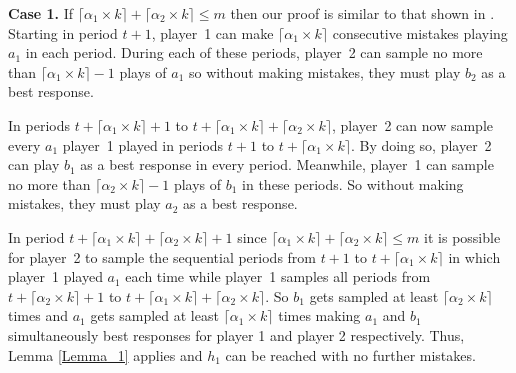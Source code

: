 \documentclass[11.5pt]{article}
\begin{document}
{\bf Case 1.} If $\lceil \alpha_1 \times k \rceil + \lceil \alpha_2 \times k \rceil \leq m$ then our proof is similar to that shown in \cite{Young1998}. Starting in period $t+1$, player~1 can make $\lceil \alpha_1 \times k \rceil$ consecutive mistakes playing $a_1$ in each period. During each of these periods, player~2 can sample no more than $\lceil \alpha_1 \times k \rceil - 1$ plays of $a_1$ so without making mistakes, they must play $b_2$ as a best response.

In periods $t+\lceil \alpha_1 \times k \rceil + 1$ to $t + \lceil \alpha_1 \times k \rceil + \lceil \alpha_2 \times k \rceil$, player~2 can now sample every $a_1$ player~1 played in periods $t+1$ to $t+\lceil \alpha_1 \times k \rceil$. By doing so, player~2 can play $b_1$ as a best response in every period. Meanwhile, player~1 can sample no more than $\lceil \alpha_2 \times k \rceil - 1$ plays of $b_1$ in these periods. So without making mistakes, they must play $a_2$ as a best response.


\begin{table}[htbp]
\centering
{}
\end{table}


In period $t + \lceil \alpha_1 \times k \rceil + \lceil \alpha_2 \times k \rceil + 1$ since $\lceil \alpha_1 \times k \rceil + \lceil \alpha_2 \times k \rceil \leq m$ it is possible for player~2 to sample the sequential periods from $t + 1$ to $t + \lceil \alpha_1 \times k \rceil$ in which player~1 played $a_1$ each time while player~1 samples all periods from $t+\lceil \alpha_2 \times k \rceil + 1$ to $t + \lceil \alpha_1 \times k \rceil + \lceil \alpha_2 \times k \rceil$. So $b_1$ gets sampled at least $\lceil \alpha_2 \times k \rceil$ times and $a_1$ gets sampled at least $\lceil \alpha_1 \times k \rceil$ times making $a_1$ and $b_1$ simultaneously best responses for player 1 and player 2 respectively. Thus, Lemma \ref{Lemma_1} applies and $h_1$ can be reached with no further mistakes. 
\end{document}
